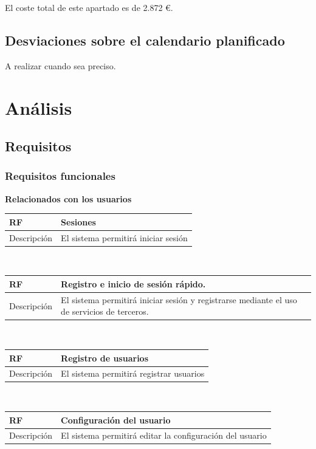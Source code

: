 \documentclass[twoside]{report}
\newcommand\addrow[2]{#1 &#2\\ }
\newcommand\addheading[2]{#1 &#2\\ \hline}
\newcommand\tabularhead{\begin{tabular}{lp{0.7\textwidth}}
\hline
}
\newenvironment{req}{\tabularhead}
{\hline\end{tabular}}
\begin{document}
El coste total de este apartado es de 2.872 \euro.

\subsection{Desviaciones sobre el calendario planificado}
A realizar cuando sea preciso.
\section{Análisis}
\subsection{Requisitos}

\subsubsection{Requisitos funcionales}

\textbf{Relacionados con los usuarios}\\

\begin{req}
	\addheading{\textbf{RF\arabic{functionalRequirements}}}{Sesiones}
	\addrow{Descripción}{El sistema permitirá iniciar sesión}
\end{req} \\
 
\begin{req}
	\addheading{\textbf{RF\arabic{functionalRequirements}}}{Registro e inicio de sesión rápido.}
	\addrow{Descripción}{El sistema permitirá iniciar sesión y registrarse mediante el uso de servicios de terceros.}
\end{req} \\

\begin{req}
	\addheading{\textbf{RF\arabic{functionalRequirements}}}{Registro de usuarios}
	\addrow{Descripción}{El sistema permitirá registrar usuarios}
\end{req}\\

\begin{req}
	\addheading{\textbf{RF\arabic{functionalRequirements}}}{Configuración del usuario}
	\addrow{Descripción}{El sistema permitirá editar la configuración del usuario}
\end{req}\\
\end{document}
